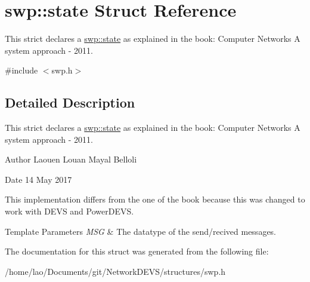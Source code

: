 \hypertarget{structswp_1_1state}{}\section{swp\+:\+:state Struct Reference}
\label{structswp_1_1state}


This strict declares a \hyperlink{structswp_1_1state}{swp\+::state} as explained in the book\+: Computer Networks A system approach -\/ 2011.  




{\ttfamily \#include $<$swp.\+h$>$}



\subsection{Detailed Description}
This strict declares a \hyperlink{structswp_1_1state}{swp\+::state} as explained in the book\+: Computer Networks A system approach -\/ 2011. 

\begin{DoxyAuthor}{Author}
Laouen Louan Mayal Belloli 
\end{DoxyAuthor}
\begin{DoxyDate}{Date}
14 May 2017
\end{DoxyDate}
This implementation differs from the one of the book because this was changed to work with D\+E\+VS and Power\+D\+E\+VS.


\begin{DoxyTemplParams}{Template Parameters}
{\em M\+SG} & The datatype of the send/recived messages. \\
\hline
\end{DoxyTemplParams}


The documentation for this struct was generated from the following file\+:\begin{DoxyCompactItemize}
\item 
/home/lao/\+Documents/git/\+Network\+D\+E\+V\+S/structures/swp.\+h\end{DoxyCompactItemize}
